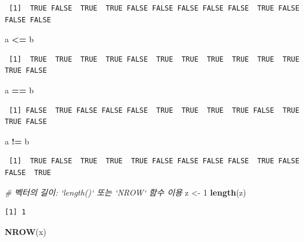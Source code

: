 \documentclass[11pt,a4paper]{book}
\newenvironment{Shaded}{\begin{snugshade}}{\end{snugshade}}
\newcommand{\KeywordTok}[1]{\textcolor[rgb]{0.13,0.29,0.53}{\textbf{#1}}}
\newcommand{\DecValTok}[1]{\textcolor[rgb]{0.00,0.00,0.81}{#1}}
\newcommand{\StringTok}[1]{\textcolor[rgb]{0.31,0.60,0.02}{#1}}
\newcommand{\CommentTok}[1]{\textcolor[rgb]{0.56,0.35,0.01}{\textit{#1}}}
\newcommand{\OperatorTok}[1]{\textcolor[rgb]{0.81,0.36,0.00}{\textbf{#1}}}
\newcommand{\NormalTok}[1]{#1}
\theoremstyle{definition}
\theoremstyle{definition}
\theoremstyle{definition}
\theoremstyle{remark}
\begin{document}
\begin{verbatim}
 [1]  TRUE FALSE  TRUE  TRUE FALSE FALSE FALSE FALSE FALSE  TRUE FALSE FALSE FALSE
\end{verbatim}

\begin{Shaded}
\begin{Highlighting}[]
\NormalTok{a }\OperatorTok{<=}\StringTok{ }\NormalTok{b}
\end{Highlighting}
\end{Shaded}

\begin{verbatim}
 [1]  TRUE  TRUE  TRUE  TRUE FALSE  TRUE  TRUE  TRUE  TRUE  TRUE  TRUE  TRUE FALSE
\end{verbatim}

\begin{Shaded}
\begin{Highlighting}[]
\NormalTok{a }\OperatorTok{==}\StringTok{ }\NormalTok{b}
\end{Highlighting}
\end{Shaded}

\begin{verbatim}
 [1] FALSE  TRUE FALSE FALSE FALSE  TRUE  TRUE  TRUE  TRUE FALSE  TRUE  TRUE FALSE
\end{verbatim}

\begin{Shaded}
\begin{Highlighting}[]
\NormalTok{a }\OperatorTok{!=}\StringTok{ }\NormalTok{b}
\end{Highlighting}
\end{Shaded}

\begin{verbatim}
 [1]  TRUE FALSE  TRUE  TRUE  TRUE FALSE FALSE FALSE FALSE  TRUE FALSE FALSE  TRUE
\end{verbatim}

\begin{Shaded}
\begin{Highlighting}[]
\CommentTok{# 벡터의 길이: `length()` 또는 `NROW` 함수 이용}
\NormalTok{z <-}\StringTok{ }\DecValTok{1}
\KeywordTok{length}\NormalTok{(z)}
\end{Highlighting}
\end{Shaded}

\begin{verbatim}
[1] 1
\end{verbatim}

\begin{Shaded}
\begin{Highlighting}[]
\KeywordTok{NROW}\NormalTok{(x)}
\end{Highlighting}
\end{Shaded}
\end{document}
